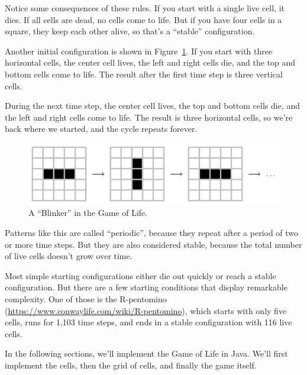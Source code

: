 
Notice some consequences of these rules.
If you start with a single live cell, it dies.
If all cells are dead, no cells come to life.
But if you have four cells in a square, they keep each other alive, so that's a ``stable'' configuration.

Another initial configuration is shown in Figure~\ref{fig:blinker}.
If you start with three horizontal cells, the center cell lives, the left and right cells die, and the top and bottom cells come to life.
The result after the first time step is three vertical cells.

During the next time step, the center cell lives, the top and bottom cells die, and the left and right cells come to life.
The result is three horizontal cells, so we're back where we started, and the cycle repeats forever.

\begin{figure}[!ht]
\begin{center}
\includegraphics[trim=0 20 0 20,clip,width=0.95\linewidth]{figs/figure15-2.png}
\caption{A ``Blinker'' in the Game of Life.}
\label{fig:blinker}
\end{center}
\end{figure}

Patterns like this are called ``periodic'', because they repeat after a period of two or more time steps.
But they are also considered stable, because the total number of live cells doesn't grow over time.

Most simple starting configurations either die out quickly or reach a stable configuration.
But there are a few starting conditions that display remarkable complexity.
One of those is the R-pentomino (\url{https://www.conwaylife.com/wiki/R-pentomino}), which starts with only five cells, runs for 1,103 time steps, and ends in a stable configuration with 116 live cells.

In the following sections, we'll implement the Game of Life in Java.
We'll first implement the cells, then the grid of cells, and finally the game itself.


